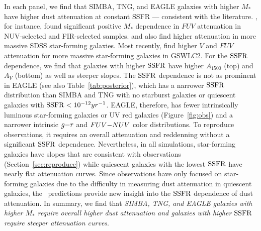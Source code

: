 In each panel, we find that SIMBA, TNG, and EAGLE galaxies with higher
$M_*$ have higher dust attenuation at constant SSFR --- consistent with the literature.
\cite{burgarella2005}, for instance, found significant positive $M_*$
dependence in $FUV$ attenuation in NUV-selected and FIR-selected samples. 
\cite{garn2010} and \cite{battisti2016} also find higher attenuation in
more massive SDSS star-forming galaxies. 
Most recently, \cite{salim2018} find higher $V$ and $FUV$ attenuation for
more massive star-forming galaxies in GSWLC2. 
For the ${\rm SSFR}$ dependence, we find that galaxies with higher ${\rm SSFR}$ have
higher $A_{1500}$ (top) and $A_V$ (bottom) as well as steeper slopes. 
The ${\rm SSFR}$ dependence is not as prominent in EAGLE (see also
Table~\ref{tab:posterior}), which has a narrower ${\rm SSFR}$ distribution than
SIMBA and TNG with no starburst galaxies or quiescent galaxies with ${\rm SSFR} <
10^{-12}yr^{-1}$. 
EAGLE, therefore, has fewer intrinsically luminous star-forming galaxies
or UV red galaxies (Figure~\ref{fig:obs}) and a narrower intrinsic $g{-}r$
and $FUV{-}NUV$ color distributions. 
To reproduce observations, it requires an overall attenuation and reddenning
without a significant ${\rm SSFR}$ dependence. 
Nevertheless, in all simulations, star-forming galaxies have slopes that
are consistent with observations (Section~\ref{sec:reproduce}) while
quiescent galaxies with the lowest ${\rm SSFR}$ have nearly flat attenuation
curves. 
Since observations have only focused on star-forming galaxies due to the
difficulty in measuring dust attenuation in quiescent galaxies, the
\eda~predictions provide new insight into the ${\rm SSFR}$ dependence of dust
attenuation. 
In summary, we find that \emph{SIMBA, TNG, and EAGLE galaxies with higher
$M_*$ require overall higher dust attenuation and galaxies with higher
${\rm SSFR}$ require steeper attenuation curves}.
